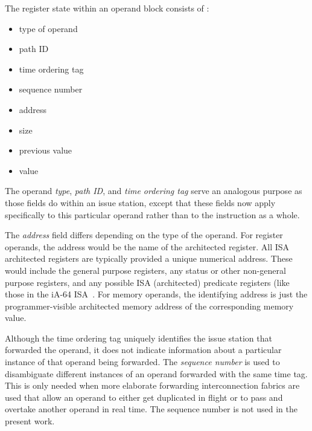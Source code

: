 \documentclass[10pt,dvips]{article}
\begin{document}
The register state within an operand block consists of :
%
\begin{itemize}
\vspace{-0.10in}
\item{type of operand}
\vspace{-0.10in}
\item{path ID}
\vspace{-0.10in}
\item{time ordering tag}
\vspace{-0.10in}
\item{sequence number}
\vspace{-0.10in}
\item{address}
\vspace{-0.10in}
\item{size}
\vspace{-0.10in}
\item{previous value}
\vspace{-0.10in}
\item{value}
\vspace{-0.10in}
\end{itemize}   
%
The operand \textit{type}, \textit{path ID}, and \textit{time ordering tag}
serve
an analogous purpose as those fields do within an issue station,
except that these fields now apply specifically to this particular
operand rather than to the instruction as a whole.

The \textit{address} field differs
depending on the type of the operand.
For register operands, the address would be
the name of the architected register.
All ISA architected registers are typically provided a
unique numerical address.  These would include the
general purpose registers, any status or other non-general
purpose registers, and any possible ISA (architected) predicate registers
(like those in the iA-64 ISA~\cite{intel99ia,schlansker00epic}.
For memory operands, the identifying address is just the
programmer-visible architected memory address of the corresponding
memory value.

Although the time ordering tag uniquely identifies the issue station
that forwarded the operand, it does not indicate information about
a particular instance of that operand being forwarded.
The \textit{sequence number} is used to disambiguate different
instances of an operand forwarded with the same time tag.
This is only needed when more elaborate forwarding interconnection fabrics
are used that allow an operand to either get duplicated in flight
or to pass and overtake another operand in real time.
The sequence number is not used in the present work.
\end{document}
